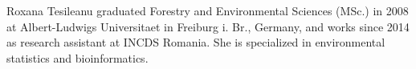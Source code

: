 \documentclass[journal]{IEEEtran}
\begin{document}
\begin {IEEEbiographynophoto}{Roxana Tesileanu}
graduated Forestry and Environmental Sciences (MSc.) in 2008 at Albert-Ludwigs Universitaet in Freiburg i. Br., Germany, and works since 2014 as research assistant at INCDS Romania. She is specialized in environmental statistics and bioinformatics. 
\end{IEEEbiographynophoto}
\end{document}
